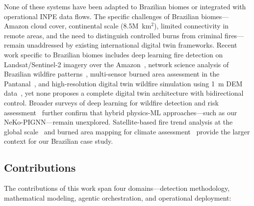 \documentclass[5p,twocolumn]{elsarticle}
\newcommand{\abbrev}[1]{{\small\textsc{#1}}}
\begin{document}
None of these systems have been adapted to Brazilian biomes or integrated with operational \abbrev{INPE} data flows. The specific challenges of Brazilian biomes---Amazon cloud cover, continental scale (8.5M~km$^2$), limited connectivity in remote areas, and the need to distinguish controlled burns from criminal fires---remain unaddressed by existing international digital twin frameworks. Recent work specific to Brazilian biomes includes deep learning fire detection on Landsat/Sentinel-2 imagery over the Amazon~\cite{sun2024}, network science analysis of Brazilian wildfire patterns~\cite{marli2024}, multi-sensor burned area assessment in the Pantanal~\cite{pereira2024_fire}, and high-resolution digital twin wildfire simulation using 1~m \abbrev{DEM} data~\cite{lee2026}, yet none proposes a complete digital twin architecture with bidirectional control. Broader surveys of deep learning for wildfire detection and risk assessment~\cite{ba2022_wildfire,de2023_cnn} further confirm that hybrid physics-ML approaches---such as our NeKo-PIGNN---remain unexplored. Satellite-based fire trend analysis at the global scale~\cite{andela2023_human} and burned area mapping for climate assessment~\cite{lizundia2024_fire} provide the larger context for our Brazilian case study.

\subsection{Contributions}

The contributions of this work span four domains---detection methodology, mathematical modeling, agentic orchestration, and operational deployment:
\end{document}
